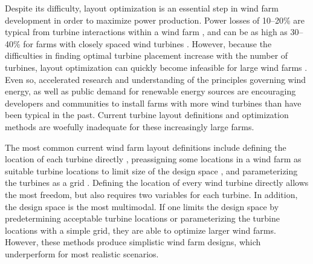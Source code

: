 \documentclass[wes, manuscript]{copernicus}
\begin{document}
Despite its difficulty, layout optimization is an essential step in wind farm development in order to maximize power production. Power losses of 10--20\% are typical from turbine interactions within a wind farm \citep{barthelmie2007modelling,barthelmie2009modelling,briggs2013navigating}, and can be as high as 30--40\% for farms with closely spaced wind turbines \citep{Stanley2017c}. 
However, because the difficulties in finding optimal turbine placement increase with the number of turbines, layout optimization can quickly become infeasible for large wind farms \citep{Ning2016a}. Even so, accelerated research and understanding of the principles governing wind energy, as well as public demand for renewable energy sources are encouraging developers and communities to install farms with more wind turbines than have been typical in the past. Current turbine layout definitions and optimization methods are woefully inadequate for these increasingly large farms. 



The most common current wind farm layout definitions include defining the location of each turbine directly \citep{feng2015solving,guirguis2016toward,Gebraad2017}, preassigning some locations in a wind farm as suitable turbine locations to limit size of the design space \citep{emami2010new,parada2017wind,ju2019wind}, and parameterizing the turbines as a grid \citep{gonzalez2017optimal,perez2018multidisciplinary}. Defining the location of every wind turbine directly allows the most freedom, but also requires two variables for each turbine. In addition, the design space is the most multimodal. 
%
%
If one limits the design space by predetermining acceptable turbine locations or parameterizing the turbine locations with a simple grid, they are able to optimize larger wind farms. However, these methods produce simplistic wind farm designs, which underperform for most realistic scenarios.
\end{document}
